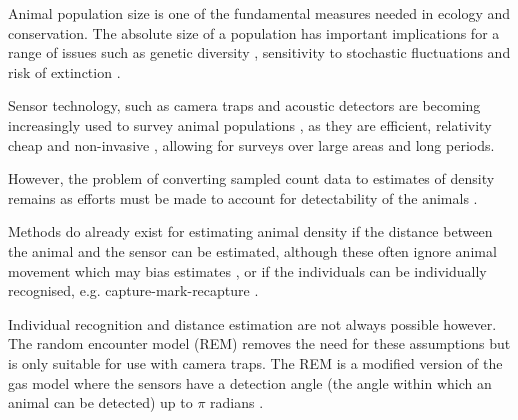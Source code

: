 Animal population size is one of the fundamental measures needed in ecology and conservation. The absolute size of a population has important implications for a range of issues such as genetic diversity \citep{o1985genetic, fischer2000genetic, willi2005threefold}, sensitivity to stochastic fluctuations \citep{richter1972extinction,wright1983stochastic} and risk of extinction \citep{purvis2000predicting}.

Sensor technology, such as camera traps \citep{rowcliffe2008surveys,ahumada2011community} and acoustic detectors \citep{ofarrel1999comparison,mellinger2007fixed,jones2011indicator} are becoming increasingly used to survey animal populations \citep{rowcliffe2008surveys, kessel2014review}, as they are efficient, relativity cheap and non-invasive \citep{gese2001monitoring, o2003crouching, silveira2003camera}, allowing for surveys over large areas and long periods. 


However, the problem of converting sampled count data to estimates of density remains as efforts must be made to account for detectability of the animals \citep{dail2011models, chandler2011inference}.


Methods do already exist for estimating animal density if the distance between the animal and the sensor can be estimated, although these often ignore animal movement which may bias estimates \citep{barlow2005estimates, marques2011estimating}, or if the individuals can be individually recognised, e.g. capture-mark-recapture \citep{karanth1995, trolle2003estimation, soisalo2006estimating, trolle2007camera}.


Individual recognition and distance estimation are not always possible however. The random encounter model (REM) removes the need for these assumptions but is only suitable for use with camera traps. The REM is a modified version of the gas model where the sensors have a detection angle (the angle within which an animal can be detected) up to $\pi$ radians \citep{rowcliffe2008estimating}. 

